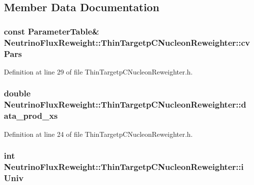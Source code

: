 \subsection{Member Data Documentation}
\hypertarget{class_neutrino_flux_reweight_1_1_thin_targetp_c_nucleon_reweighter_ae86a08603fb33286d960ec7c87024f37}{
\subsubsection[{cv\-Pars}]{\setlength{\rightskip}{0pt plus 5cm}const {\bf Parameter\-Table}\& Neutrino\-Flux\-Reweight\-::\-Thin\-Targetp\-C\-Nucleon\-Reweighter\-::cv\-Pars\hspace{0.3cm}{\ttfamily [private]}}}\label{class_neutrino_flux_reweight_1_1_thin_targetp_c_nucleon_reweighter_ae86a08603fb33286d960ec7c87024f37}


Definition at line 29 of file Thin\-Targetp\-C\-Nucleon\-Reweighter.\-h.

\hypertarget{class_neutrino_flux_reweight_1_1_thin_targetp_c_nucleon_reweighter_a42193d9c122fad580b96311a7b5e13fb}{
\subsubsection[{data\-\_\-prod\-\_\-xs}]{\setlength{\rightskip}{0pt plus 5cm}double Neutrino\-Flux\-Reweight\-::\-Thin\-Targetp\-C\-Nucleon\-Reweighter\-::data\-\_\-prod\-\_\-xs}}\label{class_neutrino_flux_reweight_1_1_thin_targetp_c_nucleon_reweighter_a42193d9c122fad580b96311a7b5e13fb}


Definition at line 24 of file Thin\-Targetp\-C\-Nucleon\-Reweighter.\-h.

\hypertarget{class_neutrino_flux_reweight_1_1_thin_targetp_c_nucleon_reweighter_a1c83cab529f6ce4d0f49370289bdf7f9}{
\subsubsection[{i\-Univ}]{\setlength{\rightskip}{0pt plus 5cm}int Neutrino\-Flux\-Reweight\-::\-Thin\-Targetp\-C\-Nucleon\-Reweighter\-::i\-Univ\hspace{0.3cm}{\ttfamily [private]}}}\label{class_neutrino_flux_reweight_1_1_thin_targetp_c_nucleon_reweighter_a1c83cab529f6ce4d0f49370289bdf7f9}


